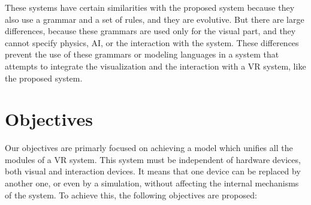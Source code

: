 \documentclass[twocolumn]{svjour3}
\begin{document}
These systems have certain similarities with the proposed system because they also use a grammar
and a set of rules, and they are evolutive. But there are large differences, because these grammars
are used only for the visual part, and they cannot specify physics, AI, or the interaction with the
system. These differences prevent the use of these grammars or modeling languages in a system that
attempts to integrate the visualization and the interaction with a VR system, like the proposed
system.




\section{Objectives
\label{sec:objectives}}

Our objectives are primarly focused on achieving a model which unifies all the modules of a VR
system. This system must be independent of hardware devices, both visual and interaction devices.
It means that one device can be replaced by another one, or even by a simulation, without affecting
the internal mechanisms of the system. To achieve this, the following objectives are proposed:
\end{document}
